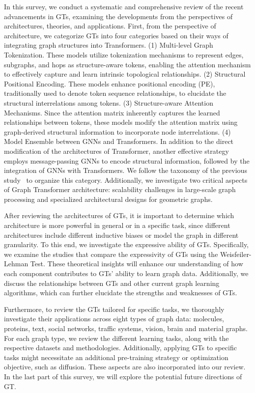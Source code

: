 In this survey, we conduct a systematic and comprehensive review of the recent advancements in GTs, examining the developments from the perspectives of architectures, theories, and applications. 
First, from the perspective of architecture, we categorize GTs into four categories based on their ways of integrating graph structures into Transformers. 
{(1) Multi-level Graph Tokenization.} These models utilize tokenization mechanisms to represent edges, subgraphs, and hops as structure-aware tokens, enabling the attention mechanism to effectively capture and learn intrinsic topological relationships.
{(2) Structural Positional Encoding.} These models enhance positional encoding (PE), traditionally used to denote token sequence relationships, to elucidate the structural interrelations among tokens.
{(3) Structure-aware Attention Mechanisms.} 
Since the attention matrix inherently captures the learned relationships between tokens, these models modify the attention matrix using graph-derived structural information to incorporate node interrelations.
{(4) Model Ensemble between GNNs and Transformers}. In addition to the direct modification of the architectures of Transformer, another effective strategy employs message-passing GNNs to encode structural information, followed by the integration of GNNs with Transformers. We follow the taxonomy of the previous study~\cite{min2022transformer} to organize this category. 
Additionally,  we investigate two critical aspects of Graph Transformer architecture: scalability challenges in large-scale graph processing and specialized architectural designs for geometric graphs.


After reviewing the architectures of GTs, it is important to determine which architecture is more powerful in general or in a specific task, since different architectures include different inductive biases or model the graph in different granularity. 
To this end, we investigate the expressive ability of GTs. 
Specifically, we examine the studies that compare the expressivity of GTs using the Weisfeiler-Lehman Test. These theoretical insights will enhance our understanding of how each component contributes to GTs' ability to learn graph data. Additionally, we discuss the relationships between GTs and other current graph learning algorithms, which can further elucidate the strengths and weaknesses of GTs.

Furthermore, to review the GTs tailored for specific tasks, we thoroughly investigate their applications across eight types of graph data: molecules, proteins, text, social networks, traffic systems, vision, brain and material graphs.
For each graph type, we review the different learning tasks, along with the respective datasets and methodologies. Additionally, applying GTs to specific tasks might necessitate an additional pre-training strategy or optimization objective, such as diffusion. These aspects are also incorporated into our review. In  the last part of this survey, we will explore the potential future directions of GT.







